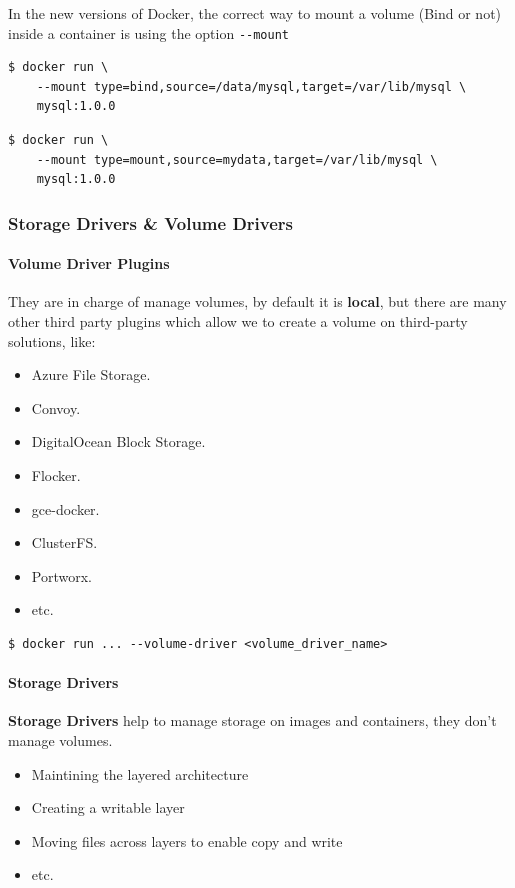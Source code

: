 \documentclass{article}
\newenvironment{blocktemplateI}[1]{%
    \tcolorbox[beamer,%
    noparskip,breakable,
    colframe=Violet,%
    colbacklower=Black,%
    title=#1]}%
    {\endtcolorbox}
\newenvironment{codetemplate}[1][]{%
  \mybasecolorbox[#1]
  \itshape
}{%
  \endmybasecolorbox
}
\begin{document}
\begin{blocktemplateI}{NOTE}
In the new versions of Docker, the correct way to mount a volume (Bind or not) inside a container is using the option \verb|--mount|
\begin{codetemplate}{}
\begin{verbatim}
$ docker run \
    --mount type=bind,source=/data/mysql,target=/var/lib/mysql \ 
    mysql:1.0.0
\end{verbatim}
\end{codetemplate}
\begin{codetemplate}{}
\begin{verbatim}
$ docker run \
    --mount type=mount,source=mydata,target=/var/lib/mysql \ 
    mysql:1.0.0
\end{verbatim}
\end{codetemplate}
\end{blocktemplateI}

\subsubsection{Storage Drivers \& Volume Drivers}

\paragraph{Volume Driver Plugins}
They are in charge of manage volumes, by default it is \textbf{local}, but there are many other third party plugins which allow we to create a volume on third-party solutions, like:
\begin{itemize}
    \item Azure File Storage.
    \item Convoy.
    \item DigitalOcean Block Storage.
    \item Flocker.
    \item gce-docker.
    \item ClusterFS.
    \item Portworx.
    \item etc.
\end{itemize}

\begin{codetemplate}{}
\begin{verbatim}
$ docker run ... --volume-driver <volume_driver_name>
\end{verbatim}
\end{codetemplate}

\paragraph{Storage Drivers}
\textbf{Storage Drivers} help to manage storage on images and containers, they don't manage volumes.
\begin{itemize}
    \item Maintining the layered architecture
    \item Creating a writable layer
    \item Moving files across layers to enable copy and write 
    \item etc.
\end{itemize}
\end{document}
